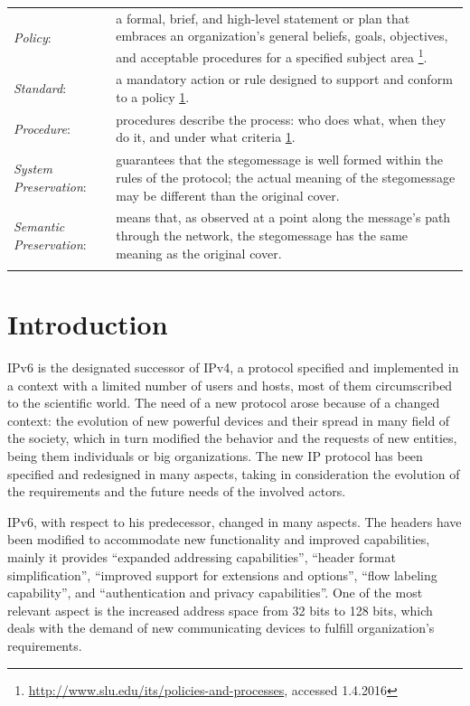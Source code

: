 \documentclass[12pt]{article}
\begin{document}
\begin{savenotes}
\begin{tabular}{L{3.3cm}L{12cm}}
\hdashline
\textit{Policy}:&a formal, brief, and high-level statement or plan that embraces an organization's general beliefs, goals, objectives, and acceptable procedures for a specified subject area \footnote{\label{policy}\url{http://www.slu.edu/its/policies-and-processes}, accessed 1.4.2016}.\\
\hdashline
\textit{Standard}:&a mandatory action or rule designed to support and conform to a policy \cref{policy}.\\
\hdashline
\textit{Procedure}:&procedures describe the process: who does what, when they do it, and under what criteria \cref{policy}.\\
\hdashline
\textit{System Preservation}:&guarantees that the stegomessage is well formed within the rules of the protocol; the actual meaning of the stegomessage may be different than the original cover\cite{lucena2}.\\
\hdashline
\textit{Semantic Preservation}:&means that, as observed at a point along the message’s path through the network, the stegomessage has the same meaning as the original cover\cite{lucena2}.\\
\hdashline
\end{tabular}
\end{savenotes}



\pagebreak

\tableofcontents
\newpage
\listoffigures
\pagebreak
\listoftables
\pagebreak

\section{Introduction}
\label{sec:1}


IPv6 is the designated successor of IPv4, a protocol specified and implemented in a context with a limited number of users and hosts, most of them circumscribed to the scientific world. The need of a new protocol arose because of a changed context: the evolution of new powerful devices and their spread in many field of the society, which in turn modified the behavior and the requests of new entities, being them individuals or big organizations. The new IP protocol has been specified and redesigned in many aspects, taking in consideration the evolution of the requirements and the future needs of the involved actors.

IPv6\cite{rfc2460}, with respect to his predecessor, changed in many aspects. The headers have been modified to accommodate new functionality and improved capabilities, mainly it provides ``expanded addressing capabilities'', ``header format simplification'', ``improved support for extensions and options'', ``flow labeling capability'', and ``authentication and privacy capabilities''. One of the most relevant aspect is the increased address space from 32 bits to 128 bits, which deals with the demand of new communicating devices to fulfill organization's requirements.
\end{document}
